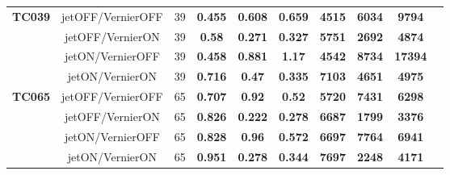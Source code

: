 \documentclass[12pt]{article}
\begin{document}
\begin{table}[H]
{\begin{tabular}{|c|c|c|c|c|c|c|c|c|c|}
%                         
\multirow{4}{*}{\textbf{TC039}} & jetOFF/VernierOFF & 39 & \textbf{0.455} & \textbf{0.608} & \textbf{0.659} & \textbf{4515} & \textbf{6034} & \textbf{9794} \\ \cline{2-9}
                       & jetOFF/VernierON  & 39 & \textbf{0.58} & \textbf{0.271} & \textbf{0.327} & \textbf{5751} & \textbf{2692} & \textbf{4874} \\ \cline{2-9}
                       & jetON/VernierOFF  & 39 & \textbf{0.458} & \textbf{0.881} & \textbf{1.17}  & \textbf{4542} & \textbf{8734} & \textbf{17394} \\ \cline{2-9}
                       & jetON/VernierON & 39 & \textbf{0.716} & \textbf{0.47}  & \textbf{0.335} & \textbf{7103} & \textbf{4651} & \textbf{4975} \\ \hline \hline
%
%
\multirow{4}{*}{\textbf{TC065}} & jetOFF/VernierOFF & 65 & \textbf{0.707} & \textbf{ 0.92} &\textbf{ 0.52} &\textbf{5720} & \textbf{7431} & \textbf{6298} \\ \cline{2-9}
                       & jetOFF/VernierON & 65 & \textbf{0.826} & \textbf{0.222} & \textbf{0.278} & \textbf{6687} & \textbf{1799} & \textbf{3376} \\ \cline{2-9}
                       & jetON/VernierOFF  & 65 & \textbf{0.828} & \textbf{0.96}  & \textbf{0.572} & \textbf{6697} & \textbf{7764} & \textbf{6941}  \\ \cline{2-9}
                       & jetON/VernierON  & 65 & \textbf{0.951} & \textbf{0.278} & \textbf{0.344} & \textbf{7697} & \textbf{2248} & \textbf{4171} \\ \hline \hline

\end{tabular}}
\end{table}
\end{document}
